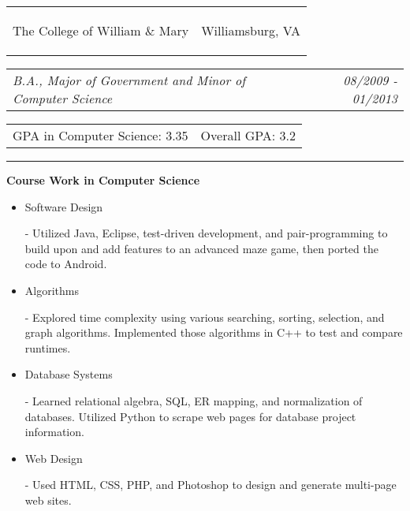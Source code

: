 \documentclass[11pt]{article}
\makeatletter
\newcommand{\headerrow}[2]
{\begin{tabular*}{\linewidth}{l@{\extracolsep{\fill}}r}
	#1 &
	#2 \\
\end{tabular*}}
\makeatother
\begin{document}
\vspace{0.4em}

\headerrow
	{\begin{Large}The College of William \& Mary\end{Large}}
	{Williamsburg, VA}
\headerrow
	{\textit{B.A., Major of Government and Minor of Computer Science}} 
	{\textit{08/2009 - 01/2013}}
\headerrow
	{GPA in Computer Science: 3.35}
	{Overall GPA: 3.2}

\vspace{0.2em}
\hrule
\vspace{0.7em}

\begin{LARGE}
	\bf Course Work in Computer Science
\end{LARGE}

\vspace{-0.4em}

\begin{itemize}
	\item \begin{large}\begin{bf}Software Design\end{bf}\end{large} - Utilized Java, Eclipse, test-driven development, and pair-programming to build upon and add features to an advanced maze game, then ported the code to Android.
	\vspace{-1.8em}
	\item \begin{large}\begin{bf}Algorithms\end{bf}\end{large} - Explored time complexity using various searching, sorting, selection, and graph algorithms. Implemented those algorithms in C++ to test and compare runtimes.
	\vspace{-0.5em}
	\item \begin{large}\begin{bf}Database Systems\end{bf}\end{large} - Learned relational algebra, SQL, ER mapping, and normalization of databases. Utilized Python to scrape web pages for database project information.
	\vspace{-0.5em}
	\item \begin{large}\begin{bf}Web Design\end{bf}\end{large} - Used HTML, CSS, PHP, and Photoshop to design and generate multi-page web sites.
\end{itemize}
\end{document}
